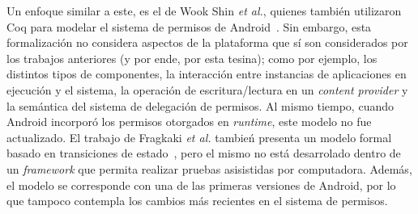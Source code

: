 Un enfoque similar a este, es el de Wook Shin \textit{et al.}, quienes también
utilizaron Coq para modelar el sistema de permisos de Android~\cite{shin}. Sin
embargo, esta formalización no considera aspectos de la plataforma que sí son
considerados por los trabajos anteriores (y por ende, por esta tesina); como por
ejemplo, los distintos tipos de componentes, la interacción entre instancias de
aplicaciones en ejecución y el sistema, la operación de escritura/lectura en un
\textit{content provider} y la semántica del sistema de delegación de permisos.
Al mismo tiempo, cuando Android incorporó los permisos otorgados en
\textit{runtime}, este modelo no fue actualizado. El trabajo de Fragkaki \textit{et al.}
tambień presenta un modelo formal basado en transiciones de
estado~\cite{fragkaki}, pero el mismo no está desarrolado dentro de un
\textit{framework} que permita realizar pruebas asisistidas por computadora.
Además, el modelo se corresponde con una de las primeras versiones de Android,
por lo que tampoco contempla los cambios más recientes en el sistema de
permisos.